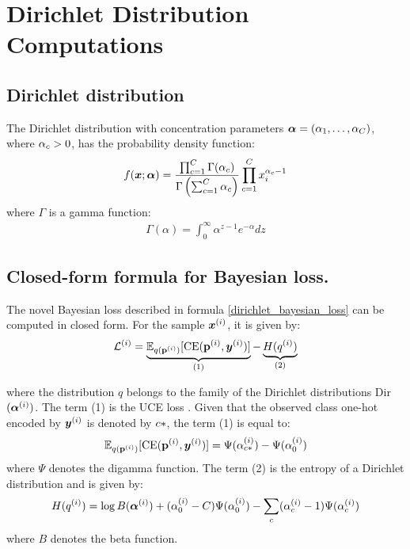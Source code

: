 \section{Dirichlet Distribution Computations}

\subsection{Dirichlet distribution}

The Dirichlet distribution with concentration parameters $\bm \alpha = ( \alpha_1, \dots, \alpha_C )$, where $\alpha_c > 0$, has the probability density function:
\begin{equation}
    f(\bm x; \bm \alpha) =
    \frac{\prod_{c=1}^C \Gamma(\alpha_c)}{\Gamma\left( \sum_{c=1}^C \alpha_c \right)}
    \prod_{c=1}^C x_i^{\alpha_c - 1}
\end{equation}
where $\Gamma$ is a gamma function:
\begin{align*}
    \Gamma(\alpha) = \int_0^\infty \alpha^{z-1} e^{-\alpha} dz
\end{align*}

\subsection{Closed-form formula for Bayesian loss.}

The novel Bayesian loss described in formula \ref{dirichlet_bayesian_loss} can be computed in closed form. For the sample $\bm{x}^{(i)}$, it is given by:
\begin{equation}
       \mathcal{L}^{(i)} = \underbrace{\mathbb{E}_{q(\mathbf{p}^{(i)})}[\text{CE}(\mathbf{p}^{(i)}, \bm{y}^{(i)})]}_{\text{(1)}} - \underbrace{H(q^{(i)})}_{\text{(2)}}
\end{equation}

where the distribution $q$ belongs to the family of the Dirichlet distributions Dir$(\bm{\alpha}^{(i)})$. The term (1) is the UCE loss \cite{uceloss}. Given that the observed class one-hot encoded by $\bm{y}^{(i)}$ is denoted by $c*$, the term (1) is equal to:
\begin{equation}
\mathbb{E}_{q(\mathbf{p}^{(i)})}[\text{CE}(\mathbf{p}^{(i)}, \bm{y}^{(i)})] = \Psi(\alpha_{c*}^{(i)}) - \Psi(\alpha_0^{(i)})
\end{equation}
where $\Psi$ denotes the digamma function. The term (2) is the entropy of a Dirichlet distribution and is given by:
\begin{equation}
H(q^{(i)}) = \log B(\bm{\alpha}^{(i)}) + (\alpha_0^{(i)} - C) \Psi(\alpha_0^{(i)}) - \sum_c (\alpha_c^{(i)} - 1) \Psi(\alpha_c^{(i)})
\end{equation}
where $B$ denotes the beta function.

